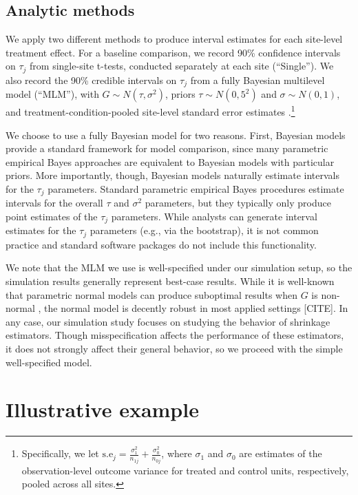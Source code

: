\documentclass[]{article}
\begin{document}
\subsection{Analytic methods}

We apply two different methods to produce interval estimates for each site-level treatment effect.
For a baseline comparison, we record 90\% confidence intervals on $\tau_j$ from single-site t-tests, conducted separately at each site (``Single'').
We also record the 90\% credible intervals on $\tau_j$ from a fully Bayesian multilevel model (``MLM''), with $G \sim N(\tau, \sigma^2)$, priors $\tau \sim N(0,5^2)$ and $\sigma \sim N(0,1)$, and treatment-condition-pooled site-level standard error estimates \citep{bloom2017using}.\footnote{Specifically, we let $\text{s.e}_j = \frac{\sigma_1^2}{n_{1j}} + \frac{\sigma_0^2}{n_{0j}}$, where $\sigma_{1}$ and $\sigma_{0}$ are estimates of the observation-level outcome variance for treated and control units, respectively, pooled across all sites.}

We choose to use a fully Bayesian model for two reasons.
First, Bayesian models provide a standard framework for model comparison, since many parametric empirical Bayes approaches are equivalent to Bayesian models with particular priors.
More importantly, though, Bayesian models naturally estimate intervals for the $\tau_j$ parameters.
Standard parametric empirical Bayes procedures estimate intervals for the overall $\tau$ and $\sigma^2$ parameters, but they typically only produce point estimates of the $\tau_j$ parameters.
While analysts can generate interval estimates for the $\tau_j$ parameters (e.g., via the bootstrap), it is not common practice and standard software packages do not include this functionality.

We note that the MLM we use is well-specified under our simulation setup, so the simulation results generally represent best-case results.
While it is well-known that parametric normal models can produce suboptimal results when $G$ is non-normal \citep{armstrong2020robust}, the normal model is decently robust in most applied settings [CITE].
In any case, our simulation study focuses on studying the behavior of shrinkage estimators.
Though misspecification affects the performance of these estimators, it does not strongly affect their general behavior, so we proceed with the simple well-specified model.


\section{Illustrative example}
\end{document}
